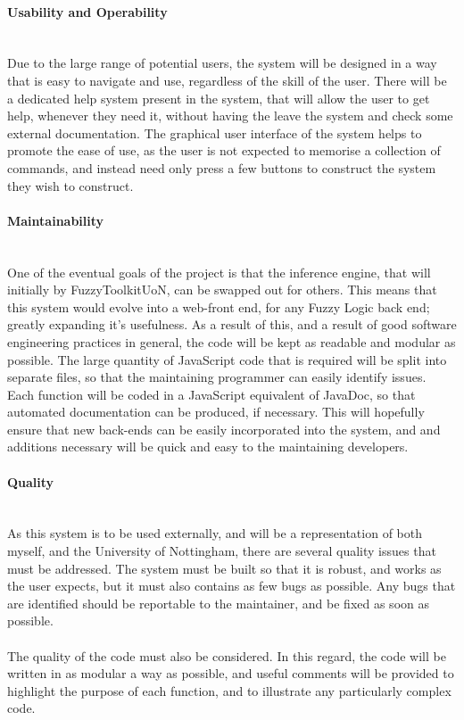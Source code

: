 \paragraph{Usability and Operability}\ \\
Due to the large range of potential users, the system will be designed in a way that is easy to navigate and use, regardless of the skill of the user. There will be a dedicated help system present in the system, that will allow the user to get help, whenever they need it, without having the leave the system and check some external documentation. The graphical user interface of the system helps to promote the ease of use, as the user is not expected to memorise a collection of commands, and instead need only press a few buttons to construct the system they wish to construct.

\paragraph{Maintainability}\ \\
One of the eventual goals of the project is that the inference engine, that will initially by FuzzyToolkitUoN, can be swapped out for others. This means that this system would evolve into a web-front end, for any Fuzzy Logic back end; greatly expanding it's usefulness. As a result of this, and a result of good software engineering practices in general, the code will be kept as readable and modular as possible. The large quantity of JavaScript code that is required will be split into separate files, so that the maintaining programmer can easily identify issues. Each function will be coded in a JavaScript equivalent of JavaDoc, so that automated documentation can be produced, if necessary. This will hopefully ensure that new back-ends can be easily incorporated into the system, and and additions necessary will be quick and easy to the maintaining developers.

\paragraph{Quality}\ \\
As this system is to be used externally, and will be a representation of both myself, and the University of Nottingham, there are several quality issues that must be addressed. The system must be built so that it is robust, and works as the user expects, but it must also contains as few bugs as possible. Any bugs that are identified should be reportable to the maintainer, and be fixed as soon as possible.\ \\
\ \\
The quality of the code must also be considered. In this regard, the code will be written in as modular a way as possible, and useful comments will be provided to highlight the purpose of each function, and to illustrate any particularly complex code.

